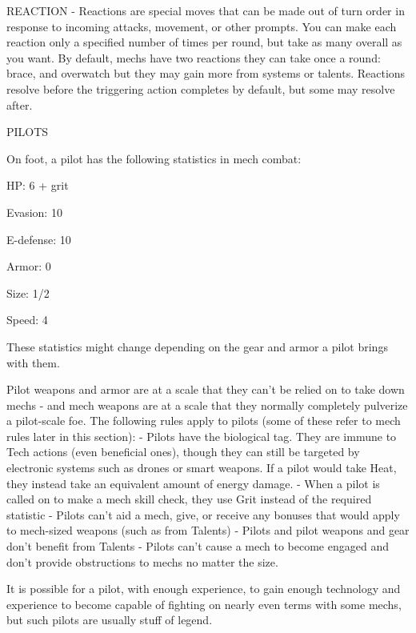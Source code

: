 REACTION - Reactions are special moves that can be made out of turn order in response to
incoming attacks, movement, or other prompts. You can make each reaction only a specified
number of times per round, but take as many overall as you want. By default, mechs have two
reactions they can take once a round: brace, and overwatch but they may gain more from
systems or talents. Reactions resolve before the triggering action completes by default, but
some may resolve after.


                                                      PILOTS

On foot, a pilot has the following statistics in mech combat:

	        HP: 6 + grit

	        Evasion: 10

         E-defense: 10

	        Armor: 0

	        Size: 1/2





	        Speed: 4


These statistics might change depending on the gear and armor a pilot brings with them.


Pilot weapons and armor are at a scale that they can’t be relied on to take down mechs - and
mech weapons are at a scale that they normally completely pulverize a pilot-scale foe. The
following rules apply to pilots (some of these refer to mech rules later in this section):
     -   Pilots have the biological tag. They are immune to Tech actions (even beneficial ones),
         though they can still be targeted by electronic systems such as drones or smart weapons.
         If a pilot would take Heat, they instead take an equivalent amount of energy damage.
     -   When a pilot is called on to make a mech skill check, they use Grit instead of the required
         statistic
     -   Pilots can’t aid a mech, give, or receive any bonuses that would apply to mech-sized
         weapons (such as from Talents)
     -   Pilots and pilot weapons and gear don’t benefit from Talents
     -   Pilots can’t cause a mech to become engaged and don’t provide obstructions to mechs no
         matter the size.

It is possible for a pilot, with enough experience, to gain enough technology and experience to
become capable of fighting on nearly even terms with some mechs, but such pilots are usually
stuff of legend.

